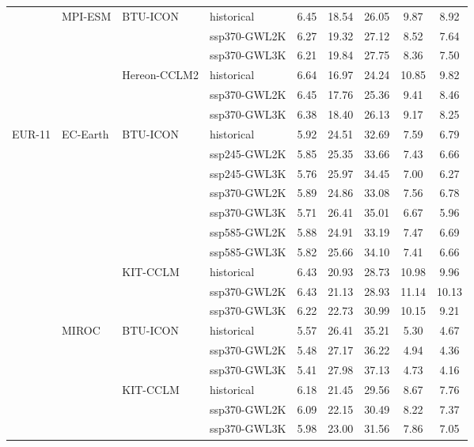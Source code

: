 \begin{table}[!htbp]
{\begin{tabular}{lll|l|c|c|c|c|c}
\cmidrule(lr){3-9}
\cmidrule(lr){2-9}
 & \multirow{6}{*}{MPI-ESM} & \multirow{3}{*}{BTU-ICON} & historical & 6.45 & 18.54 & 26.05 & 9.87 & 8.92 \\
 &  &  & ssp370-GWL2K & 6.27 & 19.32 & 27.12 & 8.52 & 7.64 \\
 &  &  & ssp370-GWL3K & 6.21 & 19.84 & 27.75 & 8.36 & 7.50 \\
\cmidrule(lr){3-9}
 &  & \multirow{3}{*}{Hereon-CCLM2} & historical & 6.64 & 16.97 & 24.24 & 10.85 & 9.82 \\
 &  &  & ssp370-GWL2K & 6.45 & 17.76 & 25.36 & 9.41 & 8.46 \\
 &  &  & ssp370-GWL3K & 6.38 & 18.40 & 26.13 & 9.17 & 8.25 \\
\midrule
\multirow{22}{*}{EUR-11} & \multirow{10}{*}{EC-Earth} & \multirow{7}{*}{BTU-ICON} & historical & 5.92 & 24.51 & 32.69 & 7.59 & 6.79 \\
 &  &  & ssp245-GWL2K & 5.85 & 25.35 & 33.66 & 7.43 & 6.66 \\
 &  &  & ssp245-GWL3K & 5.76 & 25.97 & 34.45 & 7.00 & 6.27 \\
 &  &  & ssp370-GWL2K & 5.89 & 24.86 & 33.08 & 7.56 & 6.78 \\
 &  &  & ssp370-GWL3K & 5.71 & 26.41 & 35.01 & 6.67 & 5.96 \\
 &  &  & ssp585-GWL2K & 5.88 & 24.91 & 33.19 & 7.47 & 6.69 \\
 &  &  & ssp585-GWL3K & 5.82 & 25.66 & 34.10 & 7.41 & 6.66 \\
\cmidrule(lr){3-9}
 &  & \multirow{3}{*}{KIT-CCLM} & historical & 6.43 & 20.93 & 28.73 & 10.98 & 9.96 \\
 &  &  & ssp370-GWL2K & 6.43 & 21.13 & 28.93 & 11.14 & 10.13 \\
 &  &  & ssp370-GWL3K & 6.22 & 22.73 & 30.99 & 10.15 & 9.21 \\
\cmidrule(lr){3-9}
\cmidrule(lr){2-9}
 & \multirow{6}{*}{MIROC} & \multirow{3}{*}{BTU-ICON} & historical & 5.57 & 26.41 & 35.21 & 5.30 & 4.67 \\
 &  &  & ssp370-GWL2K & 5.48 & 27.17 & 36.22 & 4.94 & 4.36 \\
 &  &  & ssp370-GWL3K & 5.41 & 27.98 & 37.13 & 4.73 & 4.16 \\
\cmidrule(lr){3-9}
 &  & \multirow{3}{*}{KIT-CCLM} & historical & 6.18 & 21.45 & 29.56 & 8.67 & 7.76 \\
 &  &  & ssp370-GWL2K & 6.09 & 22.15 & 30.49 & 8.22 & 7.37 \\
 &  &  & ssp370-GWL3K & 5.98 & 23.00 & 31.56 & 7.86 & 7.05 \\

\end{tabular}}
\end{table}
